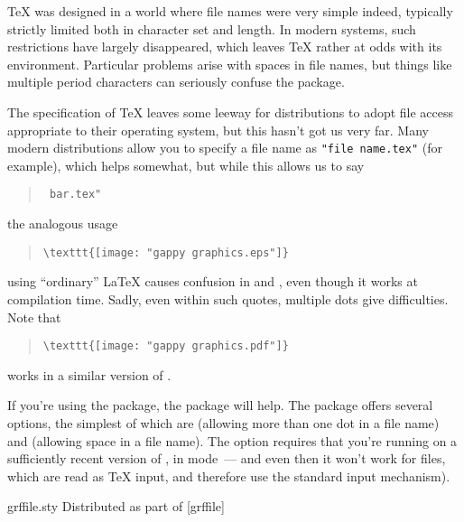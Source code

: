 \TeX{} was designed in a world where file names were very simple
indeed, typically strictly limited both in character set and length.
In modern systems, such restrictions have largely disappeared, which
leaves \TeX{} rather at odds with its environment.  Particular
problems arise with spaces in file names, but things like multiple
period characters can seriously confuse the 
package.

The specification of \TeX{} leaves some leeway for distributions to
adopt file access appropriate to their operating system, but this
hasn't got us very far.  Many modern distributions allow you to
specify a file name as \texttt{"file name.tex"} (for example), which
helps somewhat, but while this allows us to say
\begin{quote}
\begin{verbatim}
 bar.tex"
\end{verbatim}
\end{quote}
the analogous usage
\begin{quote}
\begin{verbatim}
\texttt{[image: "gappy graphics.eps"]}
\end{verbatim}
\end{quote}
using ``ordinary'' \LaTeX{} causes confusion in  and
, even though it works at compilation time.  Sadly,
even within such quotes, multiple dots give 
difficulties.  Note that
\begin{quote}
\begin{verbatim}
\texttt{[image: "gappy graphics.pdf"]}
\end{verbatim}
\end{quote}
works in a similar version of \PDFTeX{}.

If you're using the  package, the 
package will help.  The package offers several options, the simplest
of which are  (allowing more than one dot in a
file name) and  (allowing space in a file name).  The
 option requires that you're running on a
sufficiently recent version of \PDFTeX{}, in  mode~--- and
even then it won't work for \MP{} files, which are read as \TeX{}
input, and therefore use the standard input mechanism).
\begin{ctanrefs}
\item[grffile.sty]Distributed as part of [grffile]
\end{ctanrefs}

